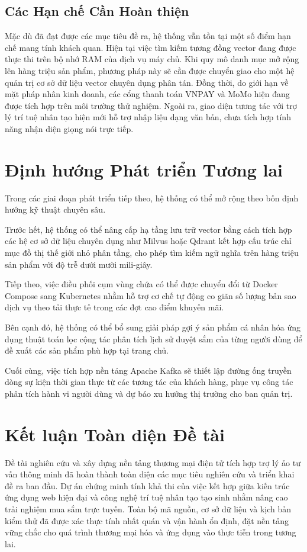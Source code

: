 \subsection{Các Hạn chế Cần Hoàn thiện}
Mặc dù đã đạt được các mục tiêu đề ra, hệ thống vẫn tồn tại một số điểm hạn chế mang tính khách quan. Hiện tại việc tìm kiếm tương đồng vector đang được thực thi trên bộ nhớ RAM của dịch vụ máy chủ. Khi quy mô danh mục mở rộng lên hàng triệu sản phẩm, phương pháp này sẽ cần được chuyển giao cho một hệ quản trị cơ sở dữ liệu vector chuyên dụng phân tán. Đồng thời, do giới hạn về mặt pháp nhân kinh doanh, các cổng thanh toán VNPAY và MoMo hiện đang được tích hợp trên môi trường thử nghiệm. Ngoài ra, giao diện tương tác với trợ lý trí tuệ nhân tạo hiện mới hỗ trợ nhập liệu dạng văn bản, chưa tích hợp tính năng nhận diện giọng nói trực tiếp.

\section{Định hướng Phát triển Tương lai}
Trong các giai đoạn phát triển tiếp theo, hệ thống có thể mở rộng theo bốn định hướng kỹ thuật chuyên sâu.

Trước hết, hệ thống có thể nâng cấp hạ tầng lưu trữ vector bằng cách tích hợp các hệ cơ sở dữ liệu chuyên dụng như Milvus hoặc Qdrant kết hợp cấu trúc chỉ mục đồ thị thế giới nhỏ phân tầng, cho phép tìm kiếm ngữ nghĩa trên hàng triệu sản phẩm với độ trễ dưới mười mili-giây.

Tiếp theo, việc điều phối cụm vùng chứa có thể được chuyển đổi từ Docker Compose sang Kubernetes nhằm hỗ trợ cơ chế tự động co giãn số lượng bản sao dịch vụ theo tải thực tế trong các đợt cao điểm khuyến mãi.

Bên cạnh đó, hệ thống có thể bổ sung giải pháp gợi ý sản phẩm cá nhân hóa ứng dụng thuật toán lọc cộng tác phân tích lịch sử duyệt sắm của từng người dùng để đề xuất các sản phẩm phù hợp tại trang chủ.

Cuối cùng, việc tích hợp nền tảng Apache Kafka sẽ thiết lập đường ống truyền dòng sự kiện thời gian thực từ các tương tác của khách hàng, phục vụ công tác phân tích hành vi người dùng và dự báo xu hướng thị trường cho ban quản trị.

\section{Kết luận Toàn diện Đề tài}
Đề tài nghiên cứu và xây dựng nền tảng thương mại điện tử tích hợp trợ lý ảo tư vấn thông minh đã hoàn thành toàn diện các mục tiêu nghiên cứu và triển khai đề ra ban đầu. Dự án chứng minh tính khả thi của việc kết hợp giữa kiến trúc ứng dụng web hiện đại và công nghệ trí tuệ nhân tạo tạo sinh nhằm nâng cao trải nghiệm mua sắm trực tuyến. Toàn bộ mã nguồn, cơ sở dữ liệu và kịch bản kiểm thử đã được xác thực tính nhất quán và vận hành ổn định, đặt nền tảng vững chắc cho quá trình thương mại hóa và ứng dụng vào thực tiễn trong tương lai.
